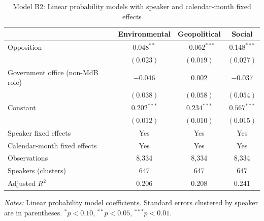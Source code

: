 
\begin{table}[H]
\centering
\small
\begin{threeparttable}
\caption{Model B2: Linear probability models with speaker and calendar-month fixed effects}
\label{tab:b2_results}
\begin{tabular}{lccc}
\toprule
 & Environmental & Geopolitical & Social \\
\midrule
Opposition & $0.048^{**}$ & $-0.062^{***}$ & $0.148^{***}$ \\
 & $(0.023)$ & $(0.019)$ & $(0.027)$ \\
\addlinespace
Government office (non-MdB role) & $-0.046$ & $0.002$ & $-0.037$ \\
 & $(0.038)$ & $(0.058)$ & $(0.054)$ \\
\addlinespace
Constant & $0.202^{***}$ & $0.234^{***}$ & $0.567^{***}$ \\
 & $(0.012)$ & $(0.010)$ & $(0.015)$ \\
\midrule
Speaker fixed effects & Yes & Yes & Yes \\
Calendar-month fixed effects & Yes & Yes & Yes \\
Observations & 8,334 & 8,334 & 8,334 \\
Speakers (clusters) & 647 & 647 & 647 \\
Adjusted $R^2$ & 0.206 & 0.208 & 0.241 \\
\bottomrule
\end{tabular}
\begin{tablenotes}[flushleft]
\footnotesize
\item \textit{Notes:} Linear probability model coefficients.
Standard errors clustered by speaker are in parentheses.
$^{*}p<0.10$, $^{**}p<0.05$, $^{***}p<0.01$.
\end{tablenotes}
\end{threeparttable}
\end{table}
